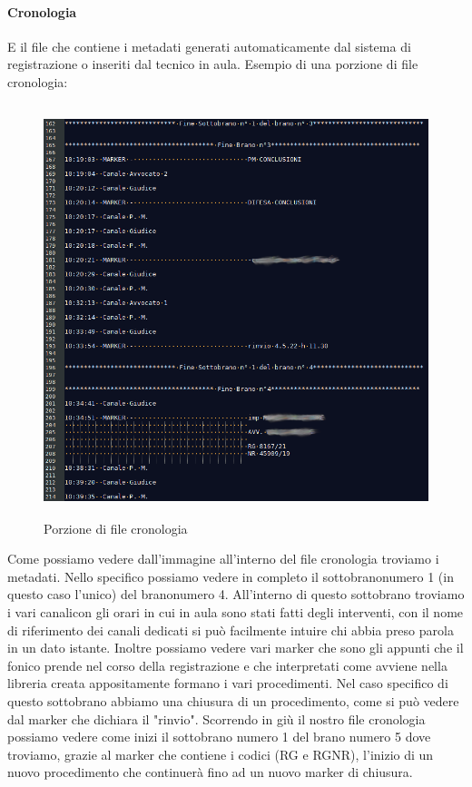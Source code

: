 \paragraph{Cronologia}
E il file che contiene i metadati generati automaticamente dal sistema di registrazione o inseriti dal tecnico in aula.
Esempio di una porzione di file cronologia:
\begin{figure}[H]
  \centering
  \includegraphics[width=\textwidth,height=12cm]{immagini/file-cronologia.png}
  \caption{Porzione di file cronologia}
\end{figure}
Come possiamo vedere dall'immagine all'interno del file cronologia troviamo i metadati. Nello specifico possiamo vedere in completo il \gls{sottobrano}\glsfirstoccur numero 1 (in questo caso l'unico)
del \gls{brano}\glsfirstoccur numero 4. All'interno di questo sottobrano troviamo i vari \gls{canali}\glsfirstoccur con gli orari in cui in aula sono stati fatti degli interventi, con il nome di riferimento dei canali dedicati
si può facilmente intuire chi abbia preso parola in un dato istante. Inoltre possiamo vedere vari marker che sono gli appunti che il fonico prende nel corso della registrazione e che
interpretati come avviene nella libreria creata appositamente formano i vari procedimenti. Nel caso specifico di questo sottobrano abbiamo una chiusura di un procedimento, come si
può vedere dal marker che dichiara il "rinvio". Scorrendo in giù il nostro file cronologia possiamo vedere come inizi il sottobrano numero 1 del brano numero 5 dove troviamo, grazie al
marker che contiene i codici (RG e RGNR), l'inizio di un nuovo procedimento che continuerà fino ad un nuovo marker di chiusura.
